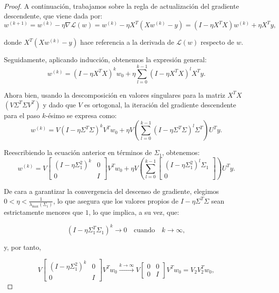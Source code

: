 \begin{proof}
    A continuación, trabajamos sobre la regla de actualización del gradiente descendente, que viene dada por:
    \[
        w^{(k+1)} = w^{(k)} - \eta \nabla \mathcal{L}(w) = w^{(k)} - \eta X^T (Xw^{(k)} - y) = (I - \eta X^T X)w^{(k)} + \eta X^T y,
    \]

    donde $X^T (Xw^{(k)} - y)$ hace referencia a la derivada de $\mathcal{L}(w)$ respecto de $w$.

    Seguidamente, aplicando inducción, obtenemos la expresión general:
    \[
        w^{(k)} = (I - \eta X^T X)^k w_0 + \eta \sum_{l=0}^{k-1} (I - \eta X^T X)^l X^T y.
    \]


    Ahora bien, usando la descomposición en valores singulares para la matriz $X^T X$ $(V \Sigma^T \Sigma V^T)$ y dado que $V$ es ortogonal, la iteración del gradiente descendente para el paso $k$-ésimo se expresa como:
    \[
        w^{(k)} = V (I - \eta \Sigma^T \Sigma)^k V^T w_0 + \eta V \left(\sum_{l=0}^{k-1} (I - \eta \Sigma^T \Sigma)^l \Sigma^T \right)U^T y.
    \]

    Reescribiendo la ecuación anterior en términos de $\Sigma_1$, obtenemos:
    \[
        w^{(k)} = V \begin{bmatrix} (I - \eta \Sigma_1^2)^k & 0 \\ 0 & I \end{bmatrix} V^T w_0 + \eta V \left(\sum_{l=0}^{k-1} \begin{bmatrix} (I - \eta \Sigma_1^2)^l \Sigma_1 \\ 0 \end{bmatrix} \right) U^T y.
    \]

    De cara a garantizar la convergencia del descenso de gradiente, elegimos $0 < \eta < \frac{1}{\lambda_{\max}(\Sigma_1)}$, lo que asegura que los valores propios de $I - \eta \Sigma^T \Sigma$ sean estrictamente menores que $1$, lo que implica, a su vez, que:

    \[
        \left( I - \eta \Sigma_1^T \Sigma_1 \right)^k \to 0 \quad \text{cuando} \quad k \to \infty,
    \]

    y, por tanto,

    \[
        V \begin{bmatrix} (I - \eta \Sigma_1^2)^k & 0 \\ 0 & I \end{bmatrix} V^T w_0 \xrightarrow{k \to \infty} V \begin{bmatrix} 0 & 0 \\ 0 & I \end{bmatrix} V^T w_0 = V_2 V_2^T w_0,
    \]


\end{proof}
